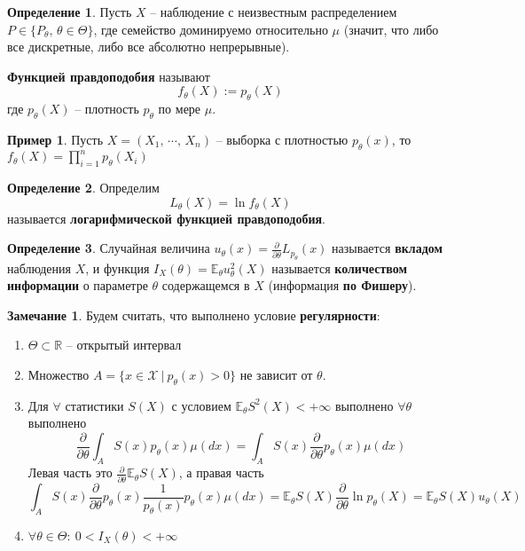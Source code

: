 \documentclass[a4paper,12pt]{article}
\theoremstyle{plain}
\theoremstyle{definition}
\newtheorem{definition}{Определение}[section]
\newtheorem*{note}{Замечание}
\newtheorem*{example}{Пример}
\theoremstyle{remark}
\begin{document}
\begin{definition}
  Пусть $X$ -- наблюдение с неизвестным распределением $P \in \{P_\theta,\, \theta \in \Theta\}$, где семейство доминируемо относительно $\mu$ (значит, что либо все дискретные, либо все абсолютно непрерывные).

  \textbf{Функцией правдоподобия} называют
  \[
    f_\theta(X) := p_\theta(X)
  \]
  где $p_\theta(X)$ -- плотность $p_\theta$ по мере $\mu$.
\end{definition}

\begin{example}
  Пусть $X = (X_1,\,\cdots,\,X_n)$ -- выборка с плотностью $p_\theta(x)$, то $f_\theta(X) = \prod_{i = 1}^n p_\theta(X_i)$
\end{example}

\begin{definition}
  Определим
  \[
    L_\theta(X) = \ln f_\theta(X)
  \]
  называется \textbf{логарифмической функцией правдоподобия}.
\end{definition}

\begin{definition}
  Случайная величина $u_\theta(x) = \frac{\partial}{\partial \theta}L_{p_\theta}(x)$ называется \textbf{вкладом} наблюдения $X$, и функция $I_X(\theta) = \mathbb{E}_\theta u_\theta^2(X)$ называется \textbf{количеством информации} о параметре $\theta$ содержащемся в $X$ (информация \textbf{по Фишеру}).
\end{definition}

\begin{note}
  Будем считать, что выполнено условие \textbf{регулярности}:
  \begin{enumerate}
    \item $\Theta \subset \mathbb{R}$ -- открытый интервал
    \item Множество $A = \{x \in \mathcal{X} \:\vert\: p_\theta(x) > 0\}$ не зависит от $\theta$.
    \item Для $\forall$ статистики $S(X)$ с условием $\mathbb{E}_\theta S^2(X) < +\infty$ выполнено $\forall \theta$ выполнено 
    \[
      \frac{\partial}{\partial\theta}\int_AS(x)p_\theta(x)\mu(dx) = \int_AS(x)\frac{\partial}{\partial \theta}p_\theta(x)\mu(dx)
    \]
    Левая часть это $\frac{\partial}{\partial\theta}\mathbb{E}_\theta S(X)$, а правая часть
    \[
      \int_AS(x)\frac{\partial}{\partial \theta}p_\theta(x)\frac{1}{p_\theta(x)}p_\theta(x)\mu(dx) = \mathbb{E}_\theta S(X)\frac{\partial}{\partial\theta}\ln p_\theta(X) = \mathbb{E}_\theta S(X)u_\theta(X)
    \]
    \item $\forall \theta \in \Theta:\:0 < I_X(\theta) < +\infty$
  \end{enumerate}
\end{note}
\end{document}
